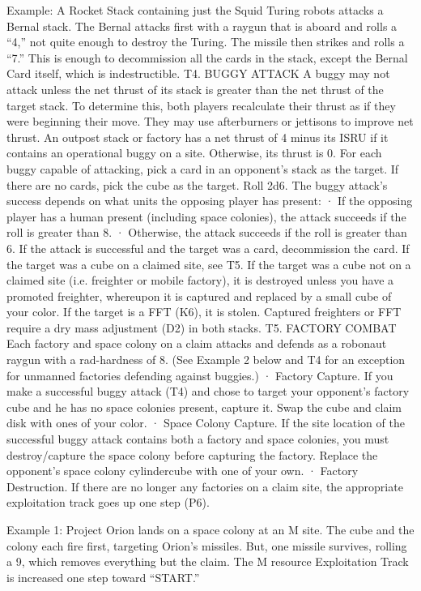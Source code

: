 \documentclass[a4paper]{book}
\begin{document}
Example: A Rocket Stack containing just the Squid Turing robots attacks a Bernal stack. The Bernal attacks first with a raygun that is aboard and rolls a “4,” not quite enough to destroy the Turing. The missile then strikes and rolls a “7.” This is enough to decommission all the cards in the stack, except the Bernal Card itself, which is indestructible.
T4. BUGGY ATTACK
A buggy may not attack unless the net thrust of its stack is greater than the net thrust of the target stack. To determine this, both players recalculate their thrust as if they were beginning their move. They may use afterburners or jettisons to improve net thrust. An outpost stack or factory has a net thrust of 4 minus its ISRU if it contains an operational buggy on a site. Otherwise, its thrust is 0.
For each buggy capable of attacking, pick a card in an opponent’s stack as the target. If there are no cards, pick the cube as the target. Roll 2d6. The buggy attack’s success depends on what units the opposing player has present:
·   	If the opposing player has a human present (including space colonies), the attack succeeds if the roll is greater than 8.
·   	Otherwise, the attack succeeds if the roll is greater than 6.
If the attack is successful and the target was a card, decommission the card. If the target was a cube on a claimed site, see T5. If the target was a cube not on a claimed site (i.e. freighter or mobile factory), it is destroyed unless you have a promoted freighter, whereupon it is captured and replaced by a small cube of your color. If the target is a FFT (K6), it is stolen. Captured freighters or FFT require a dry mass adjustment (D2) in both stacks.
T5. FACTORY COMBAT
Each factory and space colony on a claim attacks and defends as a robonaut raygun with a rad-hardness of 8. (See Example 2 below and T4 for an exception for unmanned factories defending against buggies.)
·   	Factory Capture. If you make a successful buggy attack (T4) and chose to target your opponent’s factory cube and he has no space colonies present, capture it. Swap the cube and claim disk with ones of your color.
·   	Space Colony Capture. If the site location of the successful buggy attack contains both a factory and space colonies, you must destroy/capture the space colony before capturing the factory. Replace the opponent's space colony cylindercube with one of your own.
·   	Factory Destruction. If there are no longer any factories on a claim site, the appropriate exploitation track goes up one step (P6).

Example 1: Project Orion lands on a space colony at an M site. The cube and the colony each fire first, targeting Orion’s missiles. But, one missile survives, rolling a 9, which removes everything but the claim. The M resource Exploitation Track is increased one step toward “START.”
\end{document}
